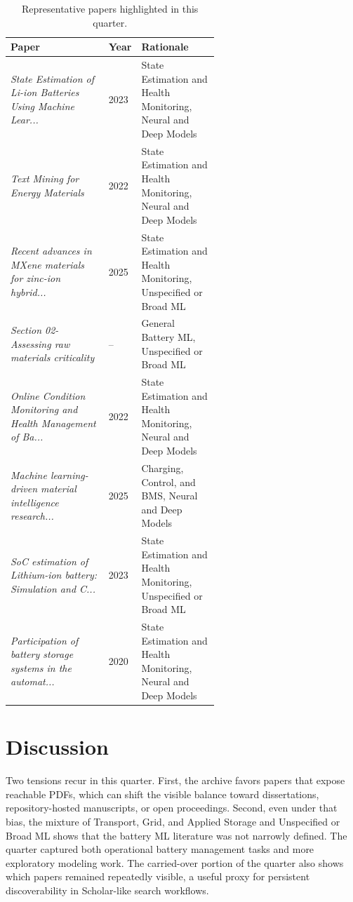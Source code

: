 \documentclass[conference]{IEEEtran}
\begin{document}
\begin{table}[t]
\caption{Representative papers highlighted in this quarter.}
\label{tab:notable}
\centering
\footnotesize
\begin{tabularx}{\linewidth}{p{0.47\linewidth} p{0.12\linewidth} X}
\toprule
Paper & Year & Rationale \\
\midrule
\textit{State Estimation of Li-ion Batteries Using Machine Lear...} \cite{stateestimationof2023} & 2023 & State Estimation and Health Monitoring, Neural and Deep Models \\
\textit{Text Mining for Energy Materials} \cite{textminingfor2022} & 2022 & State Estimation and Health Monitoring, Neural and Deep Models \\
\textit{Recent advances in MXene materials for zinc-ion hybrid...} \cite{recentadvancesin2025} & 2025 & State Estimation and Health Monitoring, Unspecified or Broad ML \\
\textit{Section 02-Assessing raw materials criticality} \cite{section02assessingna} & -- & General Battery ML, Unspecified or Broad ML \\
\textit{Online Condition Monitoring and Health Management of Ba...} \cite{onlineconditionmonitorin2022} & 2022 & State Estimation and Health Monitoring, Neural and Deep Models \\
\textit{Machine learning-driven material intelligence research...} \cite{machinelearningdriven2025} & 2025 & Charging, Control, and BMS, Neural and Deep Models \\
\textit{SoC estimation of Lithium-ion battery: Simulation and C...} \cite{socestimationof2023} & 2023 & State Estimation and Health Monitoring, Unspecified or Broad ML \\
\textit{Participation of battery storage systems in the automat...} \cite{participationofbattery2020} & 2020 & State Estimation and Health Monitoring, Neural and Deep Models \\
\bottomrule
\end{tabularx}
\end{table}

\section{Discussion}
Two tensions recur in this quarter. First, the archive favors papers that expose reachable PDFs, which can shift the visible balance toward dissertations, repository-hosted manuscripts, or open proceedings. Second, even under that bias, the mixture of Transport, Grid, and Applied Storage and Unspecified or Broad ML shows that the battery ML literature was not narrowly defined. The quarter captured both operational battery management tasks and more exploratory modeling work. The carried-over portion of the quarter also shows which papers remained repeatedly visible, a useful proxy for persistent discoverability in Scholar-like search workflows.
\end{document}
